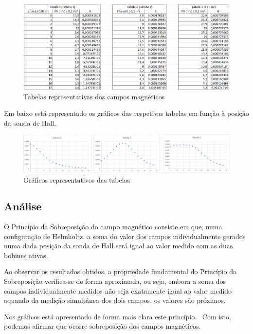 {    \begin{figure}[H]
        \centering
        \includegraphics[scale=0.6]{images/tabelas1-3-parte-b.png}
        \caption{Tabelas representativas dos campos magnéticos}
    \end{figure}

    Em baixo está representado os gráficos das respetivas tabelas em função à posição da sonda de Hall.

    \begin{figure}[H]
        \centering
        \includegraphics[scale=0.6]{images/graficos1-3-parte-b.png}
        \caption{Gráficos representativos das tabelas}
    \end{figure}

\subsection{Análise}
\label{subsec:analise-discussao-parte2-analise}
    O Princípio da Sobreposição do campo magnético consiste em que, numa configuração de Helmholtz, a soma do valor dos campos individualmente gerados numa dada posição da sonda de Hall será igual ao valor medido com as duas bobines ativas.

    \par Ao observar os resultados obtidos, a propriedade fundamental do Princípio da Sobreposição verifica-se de forma aproximada, ou seja, embora a soma dos campos individualmente medidos não seja exatamente igual ao valor medido aquando da medição simultânea dos dois campos, os valores são próximos.

    \par Nos gráficos está apresentado de forma mais clara este princípio. \ Com isto, podemos afirmar que ocorre sobreposição dos campos magnéticos.
    
}
